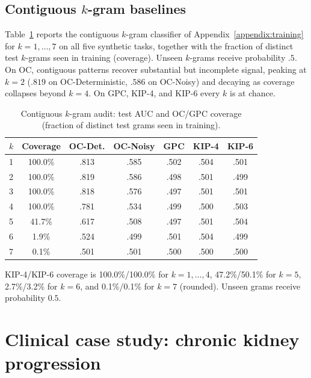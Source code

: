 \documentclass{article} %
\theoremstyle{plain}
\theoremstyle{definition}
\theoremstyle{remark}
\begin{document}
\subsection{Contiguous $k$-gram baselines}
\label{app:kgram}
Table~\ref{tab:ngram_appendix} reports the contiguous $k$-gram classifier of Appendix~\ref{appendix:training} for $k=1,\ldots,7$ on all five synthetic tasks, together with the fraction of distinct test $k$-grams seen in training (coverage). Unseen $k$-grams receive probability $.5$. On OC, contiguous patterns recover substantial but incomplete signal, peaking at $k=2$ ($.819$ on OC-Deterministic, $.586$ on OC-Noisy) and decaying as coverage collapses beyond $k=4$. On GPC, KIP-4, and KIP-6 every $k$ is at chance.

\begin{table}[h]
\centering\small
\caption{Contiguous $k$-gram audit: test AUC and OC/GPC coverage
(fraction of distinct test grams seen in training).}
\label{tab:ngram_appendix}
\begin{tabular}{lcccccc}
\toprule
$k$ & Coverage & OC-Det. & OC-Noisy & GPC & KIP-4 & KIP-6 \\
\midrule
1 & 100.0\% & .813 & .585 & .502 & .504 & .501 \\
2 & 100.0\% & .819 & .586 & .498 & .501 & .499 \\
3 & 100.0\% & .818 & .576 & .497 & .501 & .501 \\
4 & 100.0\% & .781 & .534 & .499 & .500 & .503 \\
5 & 41.7\%  & .617 & .508 & .497 & .501 & .504 \\
6 & 1.9\%   & .524 & .499 & .501 & .504 & .499 \\
7 & 0.1\%   & .501 & .501 & .500 & .500 & .500 \\
\bottomrule
\end{tabular}
\par\smallskip
\begin{minipage}{\linewidth}
\footnotesize
KIP-4/KIP-6 coverage is 100.0\%/100.0\% for $k=1,\ldots,4$,
47.2\%/50.1\% for $k=5$, 2.7\%/3.2\% for $k=6$, and
0.1\%/0.1\% for $k=7$ (rounded).
Unseen grams receive probability $0.5$.
\end{minipage}
\end{table}

\section{Clinical case study: chronic kidney progression}
\label{appendix:mimic_ckd}
\end{document}
